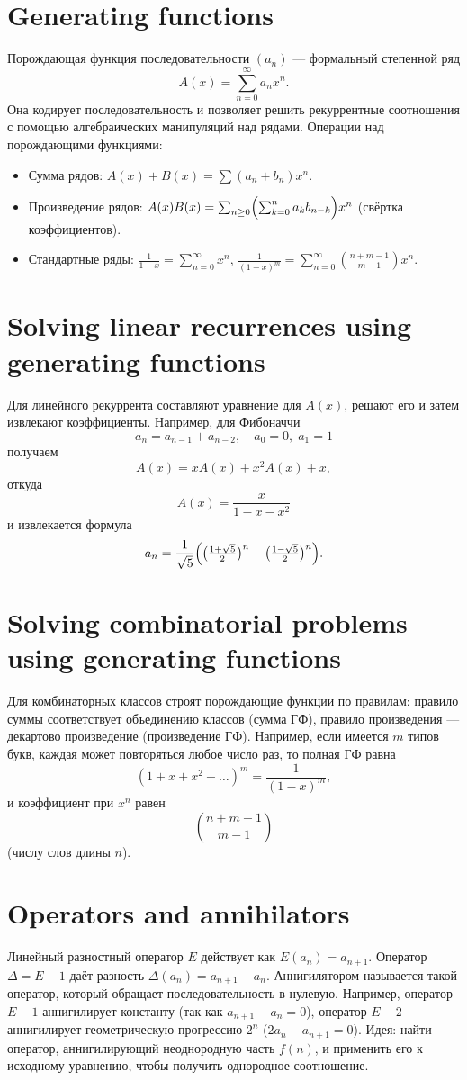\documentclass{article}
\begin{document}
\section{Generating functions}
Порождающая функция последовательности $(a_n)$ --- формальный степенной ряд
\[
A(x) = \sum_{n=0}^\infty a_n x^n.
\]
Она кодирует последовательность и позволяет решить рекуррентные соотношения с помощью алгебраических манипуляций над рядами. Операции над порождающими функциями:
\begin{itemize}
	\item Сумма рядов: $A(x)+B(x)=\sum (a_n+b_n)x^n$.
	\item Произведение рядов: $A(x)B(x)=\sum_{n\ge0}\Bigl(\sum_{k=0}^n a_k b_{n-k}\Bigr)x^n$ (свёртка коэффициентов).
	\item Стандартные ряды: $\frac{1}{1-x}=\sum_{n=0}^\infty x^n$, \;$\frac{1}{(1-x)^m}=\sum_{n=0}^\infty \binom{n+m-1}{m-1}x^n$.
\end{itemize}

\section{Solving linear recurrences using generating functions}
Для линейного рекуррента составляют уравнение для $A(x)$, решают его и затем извлекают коэффициенты. Например, для Фибоначчи 
\[
a_n = a_{n-1} + a_{n-2},\quad a_0=0,\;a_1=1
\]
получаем 
\[
A(x) = xA(x) + x^2 A(x) + x,
\]
откуда 
\[
A(x)=\frac{x}{1-x-x^2}
\]
и извлекается формула 
\[
a_n = \frac{1}{\sqrt5}\Bigl(\bigl(\tfrac{1+\sqrt5}2\bigr)^n - \bigl(\tfrac{1-\sqrt5}2\bigr)^n\Bigr).
\]

\section{Solving combinatorial problems using generating functions}
Для комбинаторных классов строят порождающие функции по правилам: правило суммы соответствует объединению классов (сумма ГФ), правило произведения --- декартово произведение (произведение ГФ). Например, если имеется $m$ типов букв, каждая может повторяться любое число раз, то полная ГФ равна 
\[
(1+x+x^2+\dots)^m = \frac{1}{(1-x)^m},
\]
и коэффициент при $x^n$ равен 
\[
\binom{n+m-1}{m-1}
\]
(числу слов длины $n$).

\section{Operators and annihilators}
Линейный разностный оператор $E$ действует как $E(a_n)=a_{n+1}$. Оператор $\Delta = E-1$ даёт разность $\Delta(a_n)=a_{n+1}-a_n$. Аннигилятором называется такой оператор, который обращает последовательность в нулевую. Например, оператор $E-1$ аннигилирует константу (так как $a_{n+1}-a_n=0$), оператор $E-2$ аннигилирует геометрическую прогрессию $2^n$ ($2a_{n} - a_{n+1}=0$). Идея: найти оператор, аннигилирующий неоднородную часть $f(n)$, и применить его к исходному уравнению, чтобы получить однородное соотношение.
\end{document}
